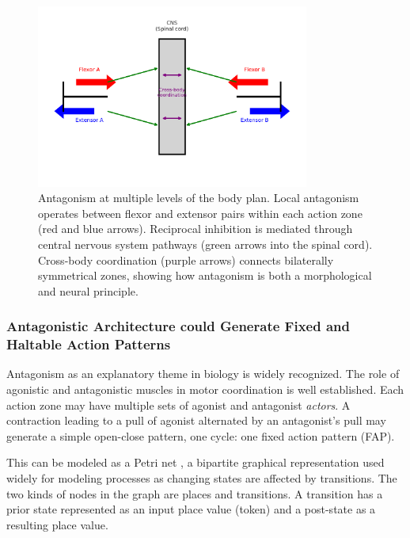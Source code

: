 \begin{figure}[htbp]
  \centering
  \includegraphics[width=0.8\textwidth]{graphics/smn_antagonism_bilateral_cns.pdf}
  \caption{%
    Antagonism at multiple levels of the body plan. 
    Local antagonism operates between flexor and extensor pairs within each action zone (red and blue arrows). 
    Reciprocal inhibition is mediated through central nervous system pathways (green arrows into the spinal cord). 
    Cross-body coordination (purple arrows) connects bilaterally symmetrical zones, showing how antagonism is both a morphological and neural principle.%
  }
  \label{fig:smn-antagonism}
\end{figure}

\subsubsection{Antagonistic Architecture could Generate Fixed and Haltable Action Patterns}
Antagonism as an explanatory theme in biology is widely recognized. The role of agonistic and antagonistic muscles in motor coordination is well established. Each action zone may have multiple sets of agonist and antagonist \textit{actors}.  A contraction leading to a pull of agonist alternated by an antagonist's pull may generate a simple open-close pattern, one cycle: one fixed action pattern (FAP). 

This can be modeled as a Petri net \cite{peterson1977petri}, a bipartite graphical representation used widely for modeling processes as changing states are affected by transitions. The two kinds of nodes in the graph are places and transitions. A transition has a prior state represented as an input place value (token) and a post-state as a resulting place value. 

